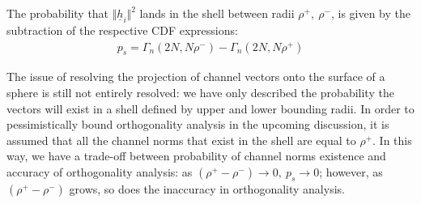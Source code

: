 The probability that $\Vert\underline{h}_i\Vert^2$ lands in the shell between radii $\rho^+,\ \rho^-$,  is given by the subtraction of the respective CDF expressions:
\begin{equation}\label{eq:p_s}
    \begin{aligned}
        p_s = \Gamma_n(2N,N\rho^-) - \Gamma_n(2N,N\rho^+)
    \end{aligned}
\end{equation}

The issue of resolving the projection of channel vectors onto the surface of a sphere is still not entirely resolved: we have only described the probability the vectors will exist in a shell defined by upper and lower bounding radii. In order to pessimistically bound orthogonality analysis in the upcoming discussion, it is assumed that all the channel norms that exist in the shell are equal to $\rho^+$. In this way, we have a trade-off between probability of channel norms existence and accuracy of orthogonality analysis: as ${(\rho^+-\rho^-)\rightarrow 0},\ p_s\rightarrow 0$; however, as  $(\rho^+-\rho^-)$ grows, so does the inaccuracy in orthogonality analysis.


